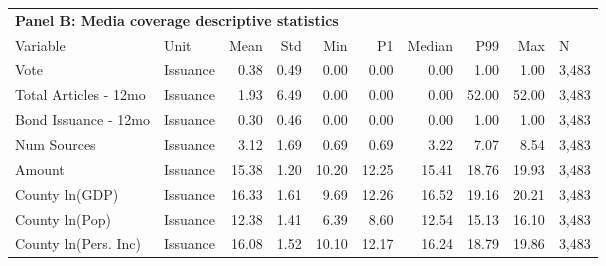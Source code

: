 \begin{table}[H]
\centering
\begin{tabular*}{\textwidth}{@{\extracolsep{\fill}}llrrrrrrrl}
\multicolumn{10}{l}{\textbf{Panel B: Media coverage descriptive statistics}}\\

\addlinespace
  \toprule
Variable & Unit & Mean & Std & Min & P1 & Median & P99 & Max & N \\ 
  \hline
Vote & Issuance & 0.38 & 0.49 & 0.00 & 0.00 & 0.00 & 1.00 & 1.00 & 3,483 \\ 
  Total Articles - 12mo & Issuance & 1.93 & 6.49 & 0.00 & 0.00 & 0.00 & 52.00 & 52.00 & 3,483 \\ 
  Bond Issuance - 12mo & Issuance & 0.30 & 0.46 & 0.00 & 0.00 & 0.00 & 1.00 & 1.00 & 3,483 \\ 
  Num Sources & Issuance & 3.12 & 1.69 & 0.69 & 0.69 & 3.22 & 7.07 & 8.54 & 3,483 \\ 
  Amount & Issuance & 15.38 & 1.20 & 10.20 & 12.25 & 15.41 & 18.76 & 19.93 & 3,483 \\ 
  County ln(GDP) & Issuance & 16.33 & 1.61 & 9.69 & 12.26 & 16.52 & 19.16 & 20.21 & 3,483 \\ 
  County ln(Pop) & Issuance & 12.38 & 1.41 & 6.39 & 8.60 & 12.54 & 15.13 & 16.10 & 3,483 \\ 
  County ln(Pers. Inc) & Issuance & 16.08 & 1.52 & 10.10 & 12.17 & 16.24 & 18.79 & 19.86 & 3,483 \\ 
   \hline
\end{tabular*}
\end{table}
